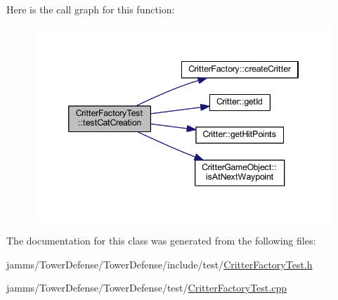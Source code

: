 Here is the call graph for this function\+:\nopagebreak
\begin{figure}[H]
\begin{center}
\leavevmode
\includegraphics[width=346pt]{class_critter_factory_test_a65f7b71bed5e2a81441a6d2d020c31c1_cgraph}
\end{center}
\end{figure}




The documentation for this class was generated from the following files\+:\begin{DoxyCompactItemize}
\item 
jamms/\+Tower\+Defense/\+Tower\+Defense/include/test/\hyperlink{_critter_factory_test_8h}{Critter\+Factory\+Test.\+h}\item 
jamms/\+Tower\+Defense/\+Tower\+Defense/test/\hyperlink{_critter_factory_test_8cpp}{Critter\+Factory\+Test.\+cpp}\end{DoxyCompactItemize}
